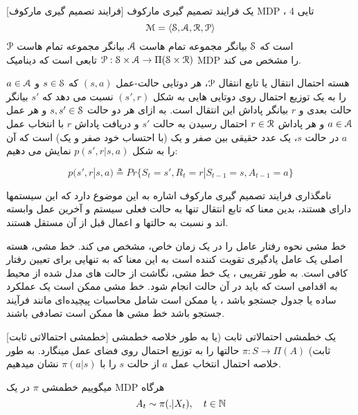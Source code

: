 [فرایند تصمیم گیری مارکوف] 
یک فرایند تصمیم گیری مارکوف
MDP
، 4 تایی 
$$\EuScript{M} = \left< \EuScript{S},\EuScript{A},\EuScript{R},\EuScript{P} \right>$$
است که
 $\EuScript{S}$ بیانگر مجموعه تمام \nf هاست
 $\EuScript{A}$ بیانگر مجموعه تمام \nf هاست
$\EuScript{P}$
$ \EuScript{P}: \EuScript{S} \times \EuScript{A} \to \Pi(\EuScript{S} \times \EuScript{R})$
تابعی است که دینامیک MDP را مشخص می کند.


هسته احتمال انتقال یا تابع انتقال $\EuScript{P}$، هر دوتایی حالت-عمل
$(s,a)$
که 
$s \in \EuScript{S}$
و
$a \in \EuScript{A}$
را به یک توزیع احتمال روی دوتایی هایی به شکل 
$(s',r)$
نسبت می دهد که $s'$ بیانگر حالت بعدی و $r$ بیانگر پاداش این انتقال است. به ازای هر دو حالت 
$s,s' \in \EuScript{S}$
 و هر عمل 
 $a \in \EuScript{A}$
  و هر پاداش 
  $r \in \EuScript{R}$
  احتمال رسیدن به حالت $s'$ و دریافت پاداش $r$ با انتخاب عمل $a$ در حالت $s$، یک عدد حقیقی بین صفر و یک (با احتساب خود صفر و یک) است که آن را به شکل
$p(s',r|s,a)$
نمایش می دهیم:

$$p(s',r|s,a) \triangleq Pr\{S_t=s',R_t=r|S_{t-1}=s,A_{t-1}=a\}$$

نامگذاری فرایند تصمیم گیری مارکوف اشاره به این موضوع دارد که این سیستم\nf ها دارای  هستند، بدین معنا که تابع انتقال تنها به حالت فعلی سیستم و آخرین عمل وابسته اند و نسبت به حالت\nf ها و اعمال قبل از آن مستقل هستند.



خط مشی نحوه رفتار عامل را در یک زمان خاص، مشخص می کند. خط مشی، هسته اصلی یک عامل یادگیری تقویت کننده است به این معنا که به تنهایی برای تعیین رفتار کافی است. به طور تقریبی ، یک خط مشی، نگاشت از حالت های مدل شده از محیط به اقدامی است که باید در آن حالت انجام شود.
خط مشی ممکن است یک عملکرد ساده یا جدول جستجو باشد ، یا ممکن است شامل محاسبات پیچیده‌ای مانند فرآیند جستجو باشد
خط مشی ها ممکن است تصادفی باشند.

[خط\nf مشی احتمالاتی ثابت]
یک خط\nf مشی احتمالاتی ثابت (یا به طور خلاصه خط\nf مشی ثابت) 
$\pi: S \to \Pi(A)$
حالت\nf ها را به توزیع احتمال روی فضای عمل می\nf نگارد.
به طور خلاصه احتمال انتخاب عمل $a$ از حالت $s$ را با
$\pi(a|s)$
نشان می\nf دهیم.


می\nf گوییم خط\nf مشی $\pi$ در یک MDP  هرگاه
$$A_t \sim \pi(. |X_t),	 \quad t \in \mathbb{N}$$

